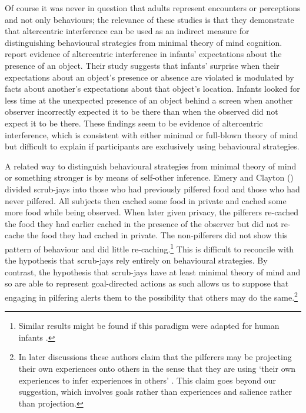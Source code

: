\documentclass[12pt,\papersize]{extarticle}
\begin{document}
Of course it was never in question that adults represent encounters or perceptions and not only behaviours; the relevance of these studies is that they demonstrate that altercentric interference can be used as an indirect measure for distinguishing behavioural strategies from minimal theory of mind cognition.  \citet[]{kovacs_social_2010} report evidence of altercentric interference in infants’ expectations about the presence of an object.  Their study suggests that infants’ surprise when their expectations about an object’s presence or absence are violated is modulated by facts about another’s expectations about that object’s location.  Infants looked for less time at the unexpected presence of an object behind a screen when another observer incorrectly expected it to be there than when the observed did not expect it to be there. These findings seem to be evidence of altercentric interference, which is consistent with either minimal or full-blown theory of mind but difficult to explain if participants are exclusively using behavioural strategies.

A related way to distinguish behavioural strategies from minimal theory of mind or something stronger is by means of self-other inference.  Emery and Clayton (\citeyear[]{en_1411}) divided scrub-jays into those who had previously pilfered food and those who had never pilfered.  All subjects then cached some food in private and cached some more food while being observed.  When later given privacy, the pilferers re-cached the food they had earlier cached in the presence of the observer but did not re-cache the food they had cached in private.  The non-pilferers did not show this pattern of behaviour and did little re-caching.\footnote{ 	Similar results might be found if this paradigm were adapted for human infants \citep[see][]{en_1707}.}  This is difficult to reconcile with the hypothesis that scrub-jays rely entirely on behavioural strategies.  By contrast, the hypothesis that scrub-jays have at least minimal theory of mind and so are able to represent goal-directed actions as such allows us to suppose that engaging in pilfering alerts them to the possibility that others may do the same.\footnote{ 	In later discussions these authors claim that the pilferers may be projecting their own experiences onto others in the sense that they are using `their own experiences to infer experiences in others' \citep[][p.\ 81]{Emery:2007ze}.  This claim goes beyond our suggestion, which involves goals rather than experiences and salience rather than projection.  }
\end{document}
